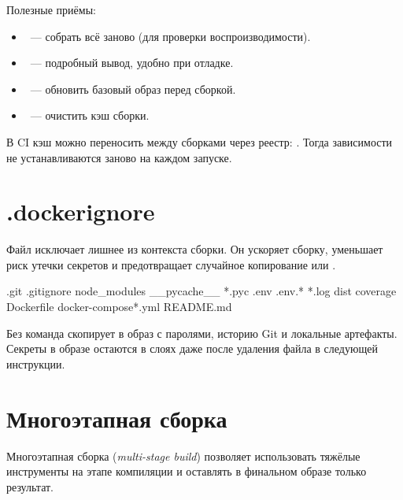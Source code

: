 Полезные приёмы:

\begin{itemize}
  \item {}~--- собрать всё заново (для проверки
        воспроизводимости).
  \item {}~--- подробный вывод, удобно при отладке.
  \item {}~--- обновить базовый образ перед сборкой.
  \item {}~--- очистить кэш сборки.
\end{itemize}

\begin{tipbox}
В CI кэш можно переносить между сборками через реестр:
. Тогда
зависимости не устанавливаются заново на каждом запуске.
\end{tipbox}

\section{.dockerignore}

Файл  исключает лишнее из контекста сборки. Он
ускоряет сборку, уменьшает риск утечки секретов и предотвращает
случайное копирование  или .

\begin{code}
.git
.gitignore
node_modules
__pycache__
*.pyc
.env
.env.*
*.log
dist
coverage
Dockerfile
docker-compose*.yml
README.md
\end{code}

\begin{warnbox}
Без  команда  скопирует в образ
 с паролями, историю Git и локальные артефакты. Секреты
в образе остаются в слоях даже после удаления файла в следующей
инструкции.
\end{warnbox}

\section{Многоэтапная сборка}

Многоэтапная сборка (\emph{multi-stage build}) позволяет использовать
тяжёлые инструменты на этапе компиляции и оставлять в финальном образе
только результат.

